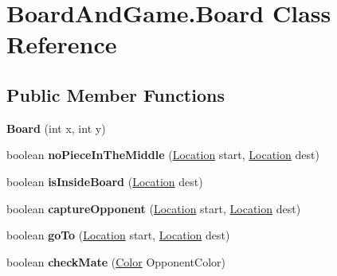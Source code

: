\hypertarget{class_board_and_game_1_1_board}{}\section{Board\+And\+Game.\+Board Class Reference}
\label{class_board_and_game_1_1_board}
\subsection*{Public Member Functions}
\begin{DoxyCompactItemize}
\item 
{\bfseries Board} (int x, int y)\hypertarget{class_board_and_game_1_1_board_a1428f0b186268c8ad2ac05565037ff31}{}\label{class_board_and_game_1_1_board_a1428f0b186268c8ad2ac05565037ff31}

\item 
boolean {\bfseries no\+Piece\+In\+The\+Middle} (\hyperlink{class_chess_pieces_1_1_location}{Location} start, \hyperlink{class_chess_pieces_1_1_location}{Location} dest)\hypertarget{class_board_and_game_1_1_board_ae89018c37930d36db7dcb78e0bcea6d5}{}\label{class_board_and_game_1_1_board_ae89018c37930d36db7dcb78e0bcea6d5}

\item 
boolean {\bfseries is\+Inside\+Board} (\hyperlink{class_chess_pieces_1_1_location}{Location} dest)\hypertarget{class_board_and_game_1_1_board_aec226eaa8db092c90b4f2dbfa647565d}{}\label{class_board_and_game_1_1_board_aec226eaa8db092c90b4f2dbfa647565d}

\item 
boolean {\bfseries capture\+Opponent} (\hyperlink{class_chess_pieces_1_1_location}{Location} start, \hyperlink{class_chess_pieces_1_1_location}{Location} dest)\hypertarget{class_board_and_game_1_1_board_ae7074c4740ef7c9f850c5aa3e8cbdacd}{}\label{class_board_and_game_1_1_board_ae7074c4740ef7c9f850c5aa3e8cbdacd}

\item 
boolean {\bfseries go\+To} (\hyperlink{class_chess_pieces_1_1_location}{Location} start, \hyperlink{class_chess_pieces_1_1_location}{Location} dest)\hypertarget{class_board_and_game_1_1_board_a2175dfc362422b753bd0f8ec55dd50f4}{}\label{class_board_and_game_1_1_board_a2175dfc362422b753bd0f8ec55dd50f4}

\item 
boolean {\bfseries check\+Mate} (\hyperlink{enum_chess_pieces_1_1_color}{Color} Opponent\+Color)\hypertarget{class_board_and_game_1_1_board_ad922490ab63ddb125c7eda9487957720}{}\label{class_board_and_game_1_1_board_ad922490ab63ddb125c7eda9487957720}


\end{DoxyCompactItemize}
